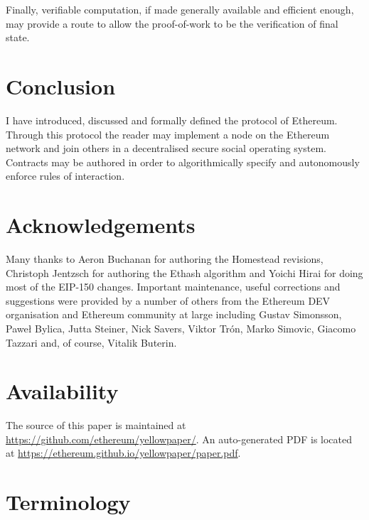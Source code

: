 \documentclass[9pt,oneside]{amsart}
\begin{document}
\begin{multicols}{2}
Finally, verifiable computation, if made generally available and efficient enough, may provide a route to allow the proof-of-work to be the verification of final state.

\section{Conclusion} \label{ch:conclusion}

I have introduced, discussed and formally defined the protocol of Ethereum. Through this protocol the reader may implement a node on the Ethereum network and join others in a decentralised secure social operating system. Contracts may be authored in order to algorithmically specify and autonomously enforce rules of interaction.

\section{Acknowledgements}

Many thanks to Aeron Buchanan for authoring the Homestead revisions, Christoph Jentzsch for authoring the Ethash algorithm and Yoichi Hirai for doing most of the EIP-150 changes. Important maintenance, useful corrections and suggestions were provided by a number of others from the Ethereum DEV organisation and Ethereum community at large including Gustav Simonsson, Pawe\l{} Bylica, Jutta Steiner, Nick Savers, Viktor Tr\'{o}n, Marko Simovic, Giacomo Tazzari and, of course, Vitalik Buterin.

\section{Availability}

The source of this paper is maintained at \url{https://github.com/ethereum/yellowpaper/}. An auto-generated PDF is located at \url{https://ethereum.github.io/yellowpaper/paper.pdf}.




\end{multicols}

\appendix

\section{Terminology}
\end{document}
